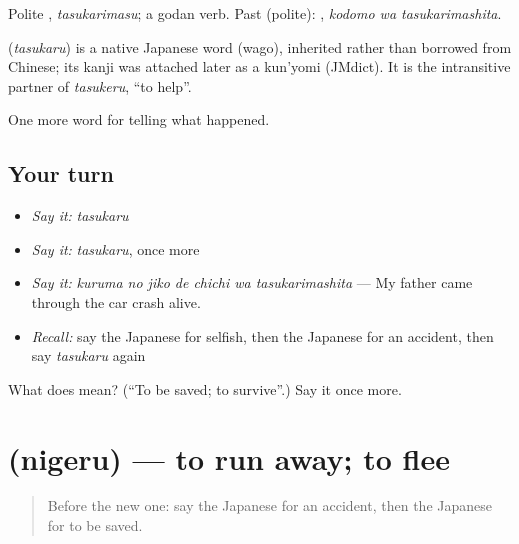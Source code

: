 Polite \textbf{}, \emph{tasukarimasu}; a godan verb. Past (polite): \textbf{ }, \emph{kodomo wa tasukarimashita}.

\begin{cousinweb}
\textbf{} (\emph{tasukaru}) is a native Japanese word (wago), inherited rather than borrowed from Chinese; its kanji was attached later as a kun'yomi (JMdict). It is the intransitive partner of \emph{tasukeru}, \textquotedblleft{}to help\textquotedblright{}.
\end{cousinweb}

\begin{grammarlens}[title={What you've built}]
One more word for telling what happened.
\end{grammarlens}

\subsection*{Your turn}
\begin{itemize}
\raggedright
  \item \emph{Say it:} \emph{tasukaru}
  \item \emph{Say it:} \emph{tasukaru}, once more
  \item \emph{Say it:} \emph{kuruma no jiko de chichi wa tasukarimashita} — My father came through the car crash alive.
  \item \emph{Recall:} say the Japanese for selfish, then the Japanese for an accident, then say \emph{tasukaru} again
\end{itemize}

\begin{tcolorbox}[breakable,colback=teal!4,colframe=teal!35!black,title={Before you move on}]
What does  mean? (\textquotedblleft{}To be saved; to survive\textquotedblright{}.) Say it once more.
\end{tcolorbox}
\section[\texorpdfstring{\ja{にげる} (nigeru)}{にげる (nigeru)}]{ (nigeru) — to run away; to flee}

\label{lesson:JA-C262-nigeru}



\begin{quote}
Before the new one: say the Japanese for an accident, then the Japanese for to be saved.
\end{quote}

